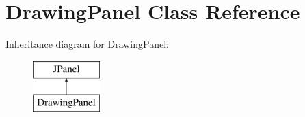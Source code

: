 \hypertarget{class_drawing_panel}{}\section{Drawing\+Panel Class Reference}
\label{class_drawing_panel}
Inheritance diagram for Drawing\+Panel\+:\begin{figure}[H]
\begin{center}
\leavevmode
\includegraphics[height=2.000000cm]{class_drawing_panel}
\end{center}
\end{figure}
